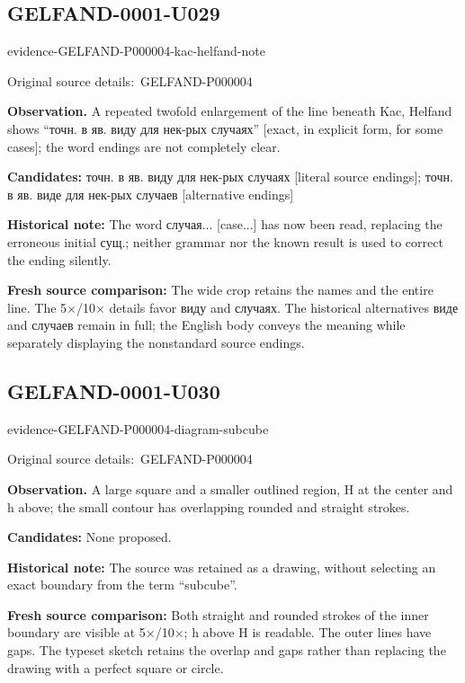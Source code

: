 \documentclass[11pt]{article}
\newcommand{\EvidenceBlock}[4]{%
 \par\smallskip\noindent\begin{minipage}{\linewidth}
 \begin{minipage}[t]{.47\linewidth}\vspace{0pt}\centering
 \csname evidence-#1-#2\endcsname\par
 {\scriptsize\SourceCropCaption\ #1}\par
 \end{minipage}\hfill
 \begin{minipage}[t]{.49\linewidth}\vspace{0pt}\raggedright
 {\small\color{orange!65!black}\textbf{#4} #3}\par
 \end{minipage}
 \end{minipage}\par\smallskip}
\newcommand{\SourceCropCaption}{Original source details:}\newcommand{\ReadingCaption}{Uncertain reading.}\newcommand{\IncompleteCaption}{Undeciphered passage.}\newcommand{\DiagramCaption}{Diagram and typed description.}
\begin{document}
\subsection*{GELFAND-0001-U029}
\EvidenceBlock{GELFAND-P000004}{kac-helfand-note}{A repeated twofold enlargement of the line beneath Kac, Helfand shows “точн. в яв. виду для нек-рых случаях” [exact, in explicit form, for some cases]; the word endings are not completely clear.}{Observation.}
\par\smallskip\noindent\textbf{Candidates: } точн. в яв. виду для нек-рых случаях [literal source endings]; точн. в яв. виде для нек-рых случаев [alternative endings]\par
\par\smallskip\noindent\textbf{Historical note: } The word случая... [case...] has now been read, replacing the erroneous initial сущ.; neither grammar nor the known result is used to correct the ending silently.\par
\par\smallskip\noindent\textbf{Fresh source comparison: } The wide crop retains the names and the entire line. The 5×/10× details favor виду and случаях. The historical alternatives виде and случаев remain in full; the English body conveys the meaning while separately displaying the nonstandard source endings.\par

\subsection*{GELFAND-0001-U030}
\EvidenceBlock{GELFAND-P000004}{diagram-subcube}{A large square and a smaller outlined region, H at the center and h above; the small contour has overlapping rounded and straight strokes.}{Observation.}
\par\smallskip\noindent\textbf{Candidates: } None proposed.\par
\par\smallskip\noindent\textbf{Historical note: } The source was retained as a drawing, without selecting an exact boundary from the term “subcube”.\par
\par\smallskip\noindent\textbf{Fresh source comparison: } Both straight and rounded strokes of the inner boundary are visible at 5×/10×; h above H is readable. The outer lines have gaps. The typeset sketch retains the overlap and gaps rather than replacing the drawing with a perfect square or circle.\par
\end{document}
